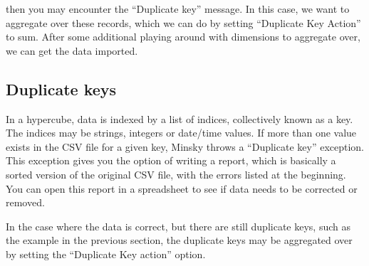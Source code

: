 \begin{center}
\end{center}

then you may encounter the ``Duplicate key'' message. In this case, we want
to aggregate over these records, which we can do by setting
``Duplicate Key Action'' to sum. After some additional playing around
with dimensions to aggregate over, we can get the data imported.

\begin{center}
\end{center}

\subsection{Duplicate keys}

In a hypercube, data is indexed by a list of indices, collectively
known as a key. The indices may be strings, integers or date/time
values. If more than one value exists in the CSV file for a given key,
Minsky throws a ``Duplicate key'' exception. This exception gives you
the option of writing a report, which is basically a sorted version of
the original CSV file, with the errors listed at the beginning. You
can open this report in a spreadsheet to see if data needs to be
corrected or removed. 

In the case where the data is correct, but there are still duplicate
keys, such as the example in the previous section, the duplicate keys
may be aggregated over by setting the ``Duplicate Key action'' option.

